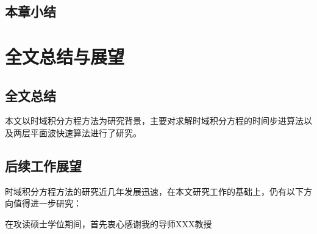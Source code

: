 \documentclass[promaster]{thesis-uestc}
\begin{document}
\section{本章小结}

\chapter{全文总结与展望}

\section{全文总结}
本文以时域积分方程方法为研究背景，主要对求解时域积分方程的时间步进算法以及两层平面波快速算法进行了研究。


\section{后续工作展望}
时域积分方程方法的研究近几年发展迅速，在本文研究工作的基础上，仍有以下方向值得进一步研究：

\thesisacknowledgement
在攻读硕士学位期间，首先衷心感谢我的导师XXX教授


\nocite{*}

%
% 
%
% 
% 
%

\end{document}
